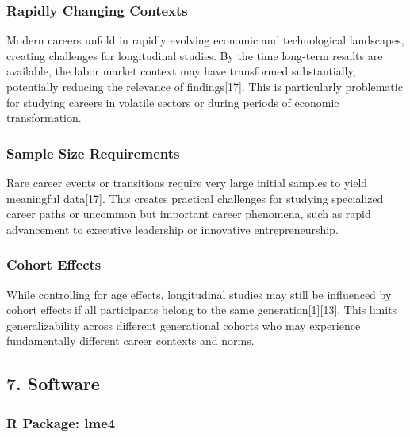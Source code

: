 \documentclass[
  letterpaper,
  DIV=11,
  numbers=noendperiod]{scrartcl}
\begin{document}
\subsubsection{Rapidly Changing
Contexts}\label{rapidly-changing-contexts}

Modern careers unfold in rapidly evolving economic and technological
landscapes, creating challenges for longitudinal studies. By the time
long-term results are available, the labor market context may have
transformed substantially, potentially reducing the relevance of
findings{[}17{]}. This is particularly problematic for studying careers
in volatile sectors or during periods of economic transformation.

\subsubsection{Sample Size Requirements}\label{sample-size-requirements}

Rare career events or transitions require very large initial samples to
yield meaningful data{[}17{]}. This creates practical challenges for
studying specialized career paths or uncommon but important career
phenomena, such as rapid advancement to executive leadership or
innovative entrepreneurship.

\subsubsection{Cohort Effects}\label{cohort-effects}

While controlling for age effects, longitudinal studies may still be
influenced by cohort effects if all participants belong to the same
generation{[}1{]}{[}13{]}. This limits generalizability across different
generational cohorts who may experience fundamentally different career
contexts and norms.

\subsection{7. Software}\label{software}

\subsubsection{R Package: lme4}\label{r-package-lme4}
\end{document}
